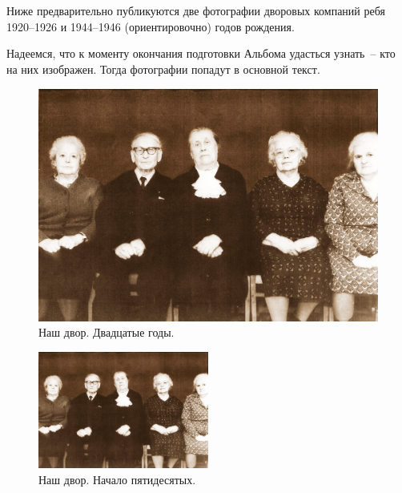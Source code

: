\chapter{}

Ниже предварительно публикуются две фотографии дворовых компаний ребя 1920--1926 и 1944--1946 (ориентировочно) годов рождения.

Надеемся, что к моменту окончания подготовки Альбома удасться узнать~-- кто на них изображен. Тогда фотографии попадут в основной текст.

\begin{figure}[h]
    \includegraphics[width=\textwidth]{inc/3/1}
    \caption{Наш двор. Двадцатые годы.}
\end{figure}

\begin{figure}[h]
    \includegraphics[width=0.5\textwidth]{inc/3/1}
    \caption{Наш двор. Начало пятидесятых.}
\end{figure}
